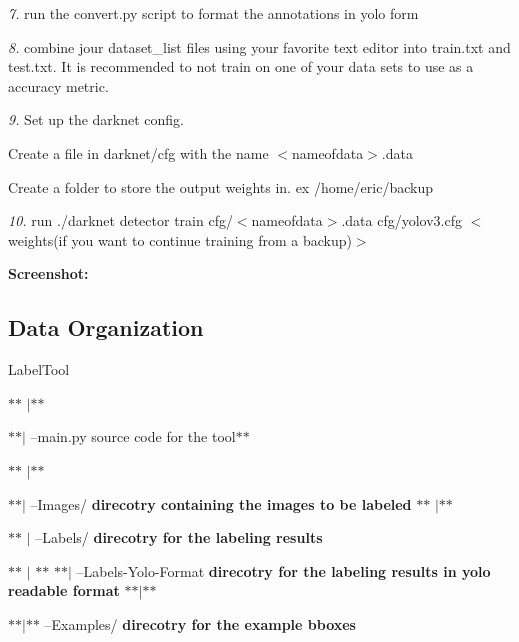 {\itshape 7.} run the convert.\+py script to format the annotations in yolo form

{\itshape 8.} combine jour dataset\+\_\+list files using your favorite text editor into train.\+txt and test.\+txt. It is recommended to not train on one of your data sets to use as a accuracy metric.

{\itshape 9.} Set up the darknet config.


\begin{DoxyItemize}
\item Create a file in darknet/cfg with the name $<$nameofdata$>$.data
\item Create a folder to store the output weights in. ex /home/eric/backup 
\begin{DoxyCode}{0}
\end{DoxyCode}

\end{DoxyItemize}

{\itshape 10.} run {\ttfamily ./darknet detector train cfg/$<$nameofdata$>$.data cfg/yolov3.\+cfg $<$weights(if you want to continue training from a backup)$>$}

{\bfseries{Screenshot\+:}} 

\subsection*{Data Organization }

Label\+Tool

$\ast$$\ast$ $\vert$$\ast$$\ast$

$\ast$$\ast$$\vert$ --main.\+py source code for the tool$\ast$$\ast$

$\ast$$\ast$ $\vert$$\ast$$\ast$

$\ast$$\ast$$\vert$ --Images/ {\bfseries{direcotry containing the images to be labeled}} $\ast$$\ast$ $\vert$$\ast$$\ast$

$\ast$$\ast$ $\vert$ --Labels/ {\bfseries{direcotry for the labeling results}}

$\ast$$\ast$ $\vert$ $\ast$$\ast$ $\ast$$\ast$$\vert$ --Labels-\/\+Yolo-\/\+Format {\bfseries{direcotry for the labeling results in yolo readable format}} $\ast$$\ast$$\vert$$\ast$$\ast$

$\ast$$\ast$$\vert$$\ast$$\ast$ --Examples/ {\bfseries{direcotry for the example bboxes}} 